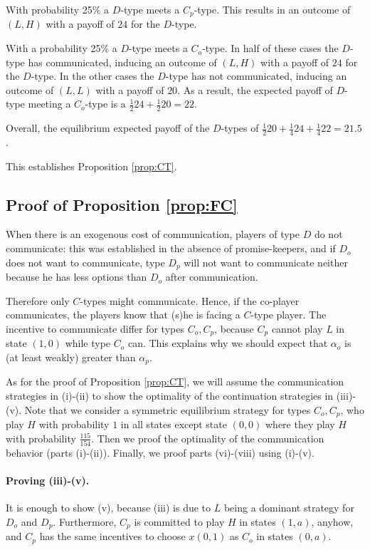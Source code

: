 \documentclass[12pt]{article}
\theoremstyle{break}
\begin{document}
With probability 25\% a $D$-type meets a $C_p$-type. This results in an outcome of $(L,H)$ with a payoff of $24$ for the $D$-type. 

With a probability 25\% a $D$-type meets a $C_o$-type. In half of these cases the $D$-type has communicated, inducing an outcome of $(L,H)$ with a payoff of $24$ for the $D$-type. In the other cases the $D$-type has not communicated, inducing an outcome of $(L,L)$ with a payoff of $20$. As a result, the expected payoff of $D$-type meeting a $C_o$-type is a $\frac{1}{2}24+\frac{1}{2}20=22$.

Overall, the equilibrium expected payoff of the $D$-types of $\frac{1}{2}20+\frac{1}{4}24+\frac{1}{4}22=21.5$.


%

This establishes Proposition \ref{prop:CT}.


%
%
%   
%    

\subsection*{Proof of Proposition \ref{prop:FC}}
When there is an exogenous cost of communication, players of type $D$ do not communicate: this was established in the absence of promise-keepers, and if $D_o$ does not want to communicate, type $D_p$ will not want to communicate neither because he has less options than $D_o$ after communication. 

Therefore only $C$-types might communicate. Hence, if the co-player communicates, the players know that (s)he is facing a $C$-type player. The incentive to communicate differ for types $C_o,C_p$, because $C_p$ cannot play $L$ in state $(1,0)$ while type $C_o$ can. This explains why we should expect that $\alpha_o$ is (at least weakly) greater than $\alpha_p$.

As for the proof of Proposition \ref{prop:CT}, we will assume the communication strategies in (i)-(ii) to show the optimality of the continuation strategies in (iii)-(v). Note that we consider a symmetric equilibrium strategy for types $C_o,C_p$, who play $H$ with probability $1$ in all states except state $(0,0)$ where they play $H$ with probability $\frac{115}{154}$.
Then we proof the optimality of the communication behavior (parts (i)-(ii)). Finally, we proof parts (vi)-(viii) using (i)-(v).

\paragraph{Proving (iii)-(v).}  It is enough to show (v), because (iii) is due to $L$ being a dominant strategy  for $D_o$ and $D_p$. Furthermore, $C_p$ is committed to play $H$ in states $(1,a)$, anyhow, and $C_p$ has the same incentives to choose $x(0,1)$ as $C_o$ in states $(0,a)$.
\end{document}
